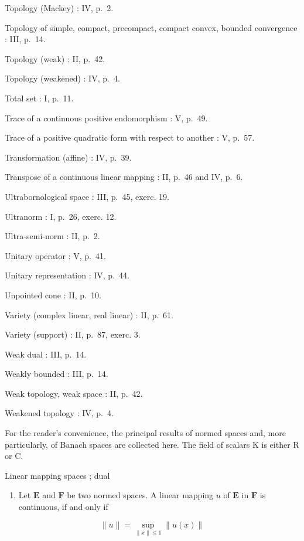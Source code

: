 Topology (Mackey) : IV, p.~2.

Topology of simple, compact, precompact, compact convex, bounded convergence : III, p.~14.

Topology (weak) : II, p.~42.

Topology (weakened) : IV, p.~4.

Total set : I, p.~11.

Trace of a continuous positive endomorphism : V, p.~49.

Trace of a positive quadratic form with respect to another : V, p.~57.

Transformation (affine) : IV, p.~39.

Transpose of a continuous linear mapping : II, p.~46 and IV, p.~6.

Ultrabornological space : III, p.~45, exerc. 19.

Ultranorm : I, p.~26, exerc. 12.

Ultra-semi-norm : II, p.~2.

Unitary operator : V, p.~41.

Unitary representation : IV, p.~44.

Unpointed cone : II, p.~10.

Variety (complex linear, real linear) : II, p.~61.

Variety (support) : II, p.~87, exerc. 3.

Weak dual : III, p.~14.

Weakly bounded : III, p.~14.

Weak topology, weak space : II, p.~42.

Weakened topology : IV, p.~4.


For the reader's convenience, the principal results of normed spaces and, more particularly, of Banach spaces are collected here. The field of scalars K is either R or C.

Linear mapping spaces ; dual

\begin{enumerate}
\def\labelenumi{\arabic{enumi})}
\tightlist
\item
  Let \(\mathbf{E}\) and \(\mathbf{F}\) be two normed spaces. A linear mapping \(u\) of \(\mathbf{E}\) in \(\mathbf{F}\) is continuous, if and only if
\end{enumerate}

\[
\| u \| = \sup _ {\| x \| \leqslant 1} \| u (x) \|\tag{1}
\]

